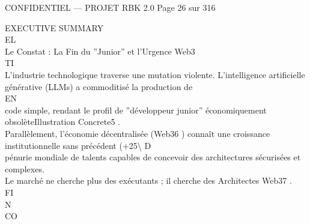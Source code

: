 \documentclass[12pt,landscape,a4paper]{article}
\newenvironment{confidential}
{\begin{tcolorbox}[
    colback=rbkred!5!white,
    colframe=rbkred!75!black,
    title=CONFIDENTIEL,
    fonttitle=\bfseries\color{white},
    coltitle=rbkred!75!black,
    breakable,
    enhanced,
    frame hidden,
    borderline west={2pt}{0pt}{rbkred!75!black}
]}
{\end{tcolorbox}}
\begin{document}
\vspace{0.5em}
\vspace{0.5em}
\vspace{0.5em}
\begin{confidential}CONFIDENTIEL — PROJET RBK 2.0                                Page 26 sur 316\end{confidential}
EXECUTIVE SUMMARY\\
\vspace{0.5em}
\vspace{0.5em}
\vspace{0.5em}
\vspace{0.5em}
EL\\
Le Constat : La Fin du ”Junior” et l’Urgence Web3\\
\vspace{0.5em}
\vspace{0.5em}
\vspace{0.5em}
\vspace{0.5em}
TI\\
L’industrie technologique traverse une mutation violente. L’intelligence artificielle générative (LLMs) a commoditisé la production de\\
\vspace{0.5em}
\vspace{0.5em}
\vspace{0.5em}
\vspace{0.5em}
EN\\
code simple, rendant le profil de ”développeur junior” économiquement obsolèteIllustration Concrete5 .\\
Parallèlement, l’économie décentralisée (Web36 ) connaît une croissance institutionnelle sans précédent (+25\textbackslash{}%
\vspace{0.5em}
\vspace{0.5em}
\vspace{0.5em}
\vspace{0.5em}
D\\
pénurie mondiale de talents capables de concevoir des architectures sécurisées et complexes.\\
Le marché ne cherche plus des exécutants ; il cherche des Architectes Web37 .\\
\vspace{0.5em}
\vspace{0.5em}
\vspace{0.5em}
FI\\
N\\
CO\\
\end{document}
